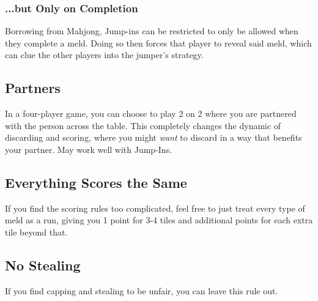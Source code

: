 \subsubsection{...but Only on Completion}
Borrowing from Mahjong, Jump-ins can be restricted to only be allowed when they complete a meld. Doing so then forces that player to reveal said meld, which can clue the other players into the jumper's strategy.

\subsection{Partners}
In a four-player game, you can choose to play 2 on 2 where you are partnered with the person across the table.
This completely changes the dynamic of discarding and scoring, where you might \textit{want} to discard in a way that benefits your partner. May work well with Jump-Ins.

\subsection{Everything Scores the Same}
If you find the scoring rules too complicated, feel free to just treat every type of meld as a run, giving you 1 point for 3-4 tiles and additional points for each extra tile beyond that.

\subsection{No Stealing}
If you find capping and stealing to be unfair, you can leave this rule out.